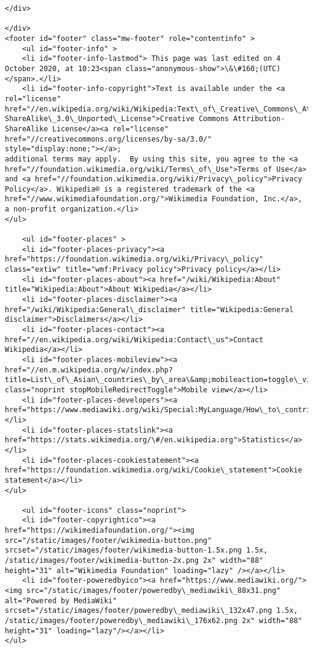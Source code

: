\documentclass[11pt]{article}
\begin{document}
\begin{Verbatim}[commandchars=\\\{\}]
</div>

</div>
<footer id="footer" class="mw-footer" role="contentinfo" >
	<ul id="footer-info" >
	<li id="footer-info-lastmod"> This page was last edited on 4 October 2020, at 10:23<span class="anonymous-show">\&\#160;(UTC)</span>.</li>
	<li id="footer-info-copyright">Text is available under the <a rel="license" href="//en.wikipedia.org/wiki/Wikipedia:Text\_of\_Creative\_Commons\_Attribution-ShareAlike\_3.0\_Unported\_License">Creative Commons Attribution-ShareAlike License</a><a rel="license" href="//creativecommons.org/licenses/by-sa/3.0/" style="display:none;"></a>;
additional terms may apply.  By using this site, you agree to the <a href="//foundation.wikimedia.org/wiki/Terms\_of\_Use">Terms of Use</a> and <a href="//foundation.wikimedia.org/wiki/Privacy\_policy">Privacy Policy</a>. Wikipedia® is a registered trademark of the <a href="//www.wikimediafoundation.org/">Wikimedia Foundation, Inc.</a>, a non-profit organization.</li>
</ul>

	<ul id="footer-places" >
	<li id="footer-places-privacy"><a href="https://foundation.wikimedia.org/wiki/Privacy\_policy" class="extiw" title="wmf:Privacy policy">Privacy policy</a></li>
	<li id="footer-places-about"><a href="/wiki/Wikipedia:About" title="Wikipedia:About">About Wikipedia</a></li>
	<li id="footer-places-disclaimer"><a href="/wiki/Wikipedia:General\_disclaimer" title="Wikipedia:General disclaimer">Disclaimers</a></li>
	<li id="footer-places-contact"><a href="//en.wikipedia.org/wiki/Wikipedia:Contact\_us">Contact Wikipedia</a></li>
	<li id="footer-places-mobileview"><a href="//en.m.wikipedia.org/w/index.php?title=List\_of\_Asian\_countries\_by\_area\&amp;mobileaction=toggle\_view\_mobile" class="noprint stopMobileRedirectToggle">Mobile view</a></li>
	<li id="footer-places-developers"><a href="https://www.mediawiki.org/wiki/Special:MyLanguage/How\_to\_contribute">Developers</a></li>
	<li id="footer-places-statslink"><a href="https://stats.wikimedia.org/\#/en.wikipedia.org">Statistics</a></li>
	<li id="footer-places-cookiestatement"><a href="https://foundation.wikimedia.org/wiki/Cookie\_statement">Cookie statement</a></li>
</ul>

	<ul id="footer-icons" class="noprint">
	<li id="footer-copyrightico"><a href="https://wikimediafoundation.org/"><img src="/static/images/footer/wikimedia-button.png" srcset="/static/images/footer/wikimedia-button-1.5x.png 1.5x, /static/images/footer/wikimedia-button-2x.png 2x" width="88" height="31" alt="Wikimedia Foundation" loading="lazy" /></a></li>
	<li id="footer-poweredbyico"><a href="https://www.mediawiki.org/"><img src="/static/images/footer/poweredby\_mediawiki\_88x31.png" alt="Powered by MediaWiki" srcset="/static/images/footer/poweredby\_mediawiki\_132x47.png 1.5x, /static/images/footer/poweredby\_mediawiki\_176x62.png 2x" width="88" height="31" loading="lazy"/></a></li>
</ul>


\end{Verbatim}
\end{document}
